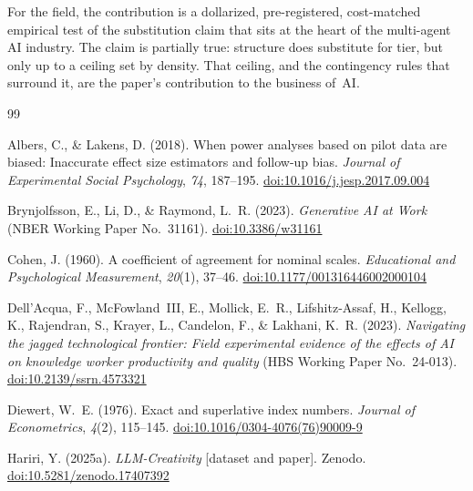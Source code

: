 \documentclass[12pt,a4paper]{article}
\begin{document}
For the field, the contribution is a dollarized, pre-registered, cost-matched
empirical test of the substitution claim that sits at the heart of the
multi-agent AI industry. The claim is partially true: structure does substitute
for tier, but only up to a ceiling set by density. That ceiling, and the
contingency rules that surround it, are the paper's contribution to the business
of~AI.

\begin{thebibliography}{99}

Albers, C., \& Lakens, D. (2018).
When power analyses based on pilot data are biased: Inaccurate effect size
  estimators and follow-up bias.
\textit{Journal of Experimental Social Psychology}, \textit{74}, 187--195.
\href{https://doi.org/10.1016/j.jesp.2017.09.004}{doi:10.1016/j.jesp.2017.09.004}

Brynjolfsson, E., Li, D., \& Raymond, L.~R. (2023).
\textit{Generative AI at Work} (NBER Working Paper No.~31161).
\href{https://doi.org/10.3386/w31161}{doi:10.3386/w31161}

Cohen, J. (1960).
A coefficient of agreement for nominal scales.
\textit{Educational and Psychological Measurement}, \textit{20}(1), 37--46.
\href{https://doi.org/10.1177/001316446002000104}{doi:10.1177/001316446002000104}

Dell'Acqua, F., McFowland~III, E., Mollick, E.~R., Lifshitz-Assaf, H.,
  Kellogg, K., Rajendran, S., Krayer, L., Candelon, F., \& Lakhani, K.~R.
  (2023).
\textit{Navigating the jagged technological frontier: Field experimental
  evidence of the effects of AI on knowledge worker productivity and quality}
  (HBS Working Paper No.~24-013).
\href{https://doi.org/10.2139/ssrn.4573321}{doi:10.2139/ssrn.4573321}

Diewert, W.~E. (1976).
Exact and superlative index numbers.
\textit{Journal of Econometrics}, \textit{4}(2), 115--145.
\href{https://doi.org/10.1016/0304-4076(76)90009-9}{doi:10.1016/0304-4076(76)90009-9}

Hariri, Y. (2025a).
\textit{LLM-Creativity} [dataset and paper]. Zenodo.
\href{https://doi.org/10.5281/zenodo.17407392}{doi:10.5281/zenodo.17407392}


\end{thebibliography}
\end{document}
